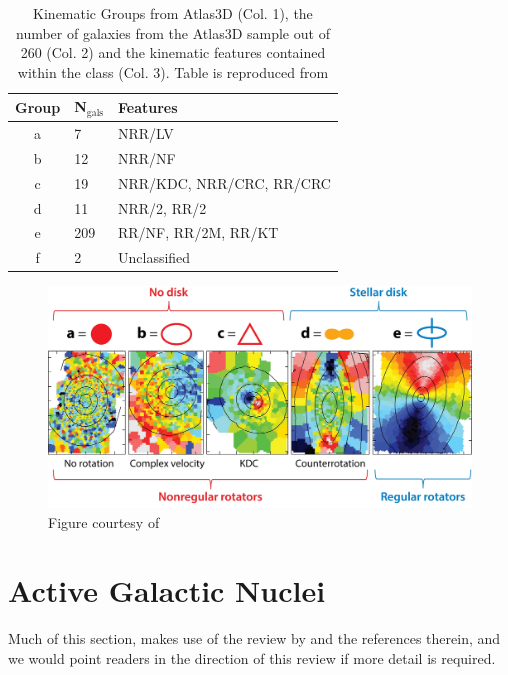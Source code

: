 	\begin{table}
		\centering
		\caption{Kinematic Groups from Atlas3D (Col. 1), the number of galaxies from the Atlas3D sample out of 260 (Col. 2) and the kinematic features contained within the class (Col. 3). Table is reproduced from \citep{Krajnovic2011}}
		\label{tab:KinGroups}
		\begin{tabular}{c l l}
			\hline
			\hline
			Group 	& N$_\text{gals}$ & Features \\
			\hline
			a 		& 7			& NRR/LV \\
			b 		& 12		& NRR/NF \\
			c 		& 19		& NRR/KDC, NRR/CRC, RR/CRC \\
			d 		& 11		& NRR/2\textsigma, RR/2\textsigma \\
			e 		& 209		& RR/NF, RR/2M, RR/KT \\
			f 		& 2			& Unclassified \\
			\hline
			\hline
		\end{tabular}
	\end{table}

	\begin{figure}
		\centering
		\includegraphics[width=\textwidth]{introduction/substructure.jpeg}
		\caption[Examples of the kinematic substructure classifications]{Figure courtesy of \citet{Cappellari2016}}
		\label{fig:EgSubstructure}
	\end{figure}



\section{Active Galactic Nuclei}
	\label{sec:AGN}
	Much of this section, makes use of the review by \citet{Heckman2014} and the references therein, and we would point readers in the direction of this review if more detail is required. 

